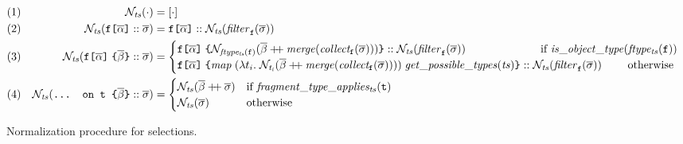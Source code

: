 \begin{figure*}[t]
\small
    \centering
    \begin{align*}
    & (1) & \tnorm{\cdot} &= [\cdot] \\
    & (2) & \tnorm{\fld :: \sset} &= 
       	\fld :: \tnorm{\filter{\sset}{\fkey}} \\      
    & (3) & \tnorm{\nfld{\overline{\beta}} :: \sset} &=
    \begin{cases}
        \nfld{\norm{ftype_{ts}(\fkey)}{\overline{\beta} \mdoubleplus \mathit{merge (collect_\fkey (\sset))}}} :: \tnorm{\filter{\sset}{\fkey}} \quad\hfill\text{ if } 
	            \mathit{is\_object\_type (ftype_{ts} (\fkey))}\\
    \nfld{\mathit{map}\; (\lambda t_{i}.\; \norm{t_{i}}{\overline{\beta} \mdoubleplus \mathit{merge (collect_{\fkey} (\sset))}})\; \mathit{get\_possible\_types (ts)}} :: \tnorm{\filter{\sset}{\fkey}} \quad\quad \text{ otherwise } 
    \end{cases}\\
    & (4) & \tnorm{\ifrag{t}{\overline{\beta}} :: \sset} &= 
    \begin{cases}
    \tnorm{\overline{\beta} \mdoubleplus \sset} & 
    \text{if }\mathit{fragment\_type\_applies_{ts}(\texttt{t})}\\
    \tnorm{\sset} & \text{otherwise}
    \end{cases}
    \end{align*}
    \caption{Normalization procedure for \gql selections. 
    }
\label{fig:normalize}
\end{figure*}

